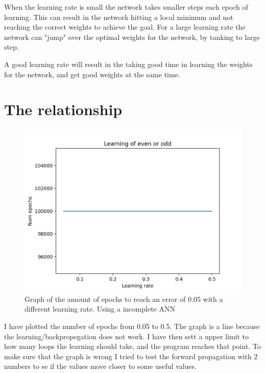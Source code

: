 \documentclass[10pt]{article}
\begin{document}
    When the learning rate is small the network takes smaller steps each epoch of learning. This can result in the network hitting a local minimum and not reaching the correct weights to achieve the goal. For a large learning rate the network can "jump" over the optimal weights for the network, by tanking to large step.

    A good learning rate will result in the taking good time in learning the weights for the network, and get good weights at the same time.

    \section{The relationship}

    \begin{center}
        \begin{figure}[h!]
            \includegraphics[scale=0.7]{Figure_1.png}
            \caption{Graph of the amount of epochs to reach an error of 0.05 with a different learning rate. Using a incomplete ANN}
        \end{figure}
    \end{center}

    I have plotted the number of epochs from 0.05 to 0.5. The graph is a line because the learning/backpropegation does not work. I have then sett a upper limit to how many loops the learning should take, and the program reaches that point. To make sure that the graph is wrong I tried to test the forward propagation with 2 numbers to se if the values move closer to some useful values.
\end{document}
